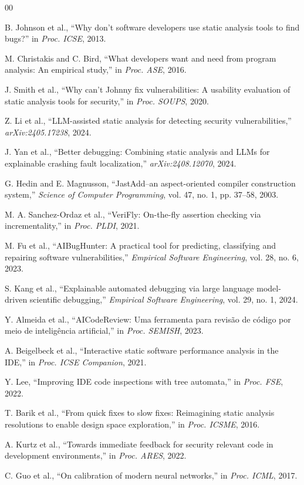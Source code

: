 \documentclass[conference]{IEEEtran}
\begin{document}
\begin{thebibliography}{00}

 B. Johnson et al., ``Why don't software developers use static analysis tools to find bugs?'' in \textit{Proc. ICSE}, 2013.

 M. Christakis and C. Bird, ``What developers want and need from program analysis: An empirical study,'' in \textit{Proc. ASE}, 2016.

 J. Smith et al., ``Why can't Johnny fix vulnerabilities: A usability evaluation of static analysis tools for security,'' in \textit{Proc. SOUPS}, 2020.

 Z. Li et al., ``LLM-assisted static analysis for detecting security vulnerabilities,'' \textit{arXiv:2405.17238}, 2024.

 J. Yan et al., ``Better debugging: Combining static analysis and LLMs for explainable crashing fault localization,'' \textit{arXiv:2408.12070}, 2024.

 G. Hedin and E. Magnusson, ``JastAdd--an aspect-oriented compiler construction system,'' \textit{Science of Computer Programming}, vol. 47, no. 1, pp. 37--58, 2003.

 M. A. Sanchez-Ordaz et al., ``VeriFly: On-the-fly assertion checking via incrementality,'' in \textit{Proc. PLDI}, 2021.

 M. Fu et al., ``AIBugHunter: A practical tool for predicting, classifying and repairing software vulnerabilities,'' \textit{Empirical Software Engineering}, vol. 28, no. 6, 2023.

 S. Kang et al., ``Explainable automated debugging via large language model-driven scientific debugging,'' \textit{Empirical Software Engineering}, vol. 29, no. 1, 2024.

 Y. Almeida et al., ``AICodeReview: Uma ferramenta para revisão de código por meio de inteligência artificial,'' in \textit{Proc. SEMISH}, 2023.

 A. Beigelbeck et al., ``Interactive static software performance analysis in the IDE,'' in \textit{Proc. ICSE Companion}, 2021.

 Y. Lee, ``Improving IDE code inspections with tree automata,'' in \textit{Proc. FSE}, 2022.

 T. Barik et al., ``From quick fixes to slow fixes: Reimagining static analysis resolutions to enable design space exploration,'' in \textit{Proc. ICSME}, 2016.

 A. Kurtz et al., ``Towards immediate feedback for security relevant code in development environments,'' in \textit{Proc. ARES}, 2022.

 C. Guo et al., ``On calibration of modern neural networks,'' in \textit{Proc. ICML}, 2017.

\end{thebibliography}
\end{document}
